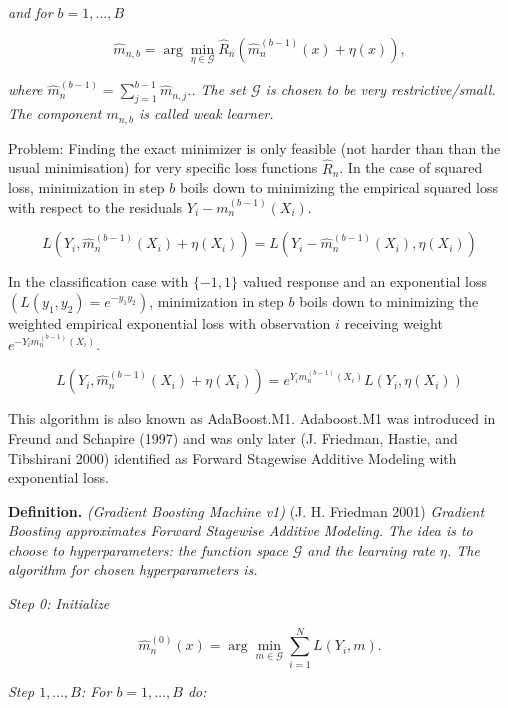\documentclass[
]{book}
\begin{document}
\emph{and for \(b=1,\dots,B\)}

\[
\hat m_{n,b} =  \arg \min_{\eta\in \mathcal G} \hat R_n\left( \hat m_n^{(b-1)}(x)+\eta(x)\right),
\]

\emph{where \(\hat m_n^{(b-1)}=\sum_{j=1}^{b-1}\hat m_{n,j}.\). The set \(\mathcal G\) is chosen to be very restrictive/small. The component \(m_{n,b}\) is called weak learner.}

Problem: Finding the exact minimizer is only feasible (not harder than than the usual minimisation) for very specific loss functions \(\hat R_n\). In the case of squared loss, minimization in step \(b\) boils down to minimizing the empirical squared loss with respect to the residuals \(Y_i- m_n^{(b-1)}(X_i)\).

\[
L\left(Y_i, \hat m_n^{(b-1)}(X_i)+\eta(X_i)\right)=L\left(Y_i-\hat m_n^{(b-1)}(X_i),\eta(X_i)\right)
\]

In the classification case with \(\{-1,1\}\) valued response and an exponential loss \((L(y_1,y_2)=e^{-y_1y_2})\), minimization in step \(b\) boils down to minimizing the weighted empirical exponential loss with observation \(i\) receiving weight \(e^{-Y_im_n^{(b-1)}(X_i)}\).

\[
L\left(Y_i,  \hat m_n^{(b-1)}(X_i)+\eta(X_i)\right)=e^{Y_im_n^{(b-1)}(X_i)}L\left(Y_i,\eta(X_i)\right)
\]

This algorithm is also known as AdaBoost.M1. Adaboost.M1 was introduced in Freund and Schapire (1997) and was only later (J. Friedman, Hastie, and Tibshirani 2000) identified as Forward Stagewise Additive Modeling with exponential loss.

\textbf{Definition.} \emph{(Gradient Boosting Machine v1)} (J. H. Friedman 2001) \emph{Gradient Boosting approximates Forward Stagewise Additive Modeling. The idea is to choose to hyperparameters: the function space \(\mathcal G\) and the learning rate \(\eta\). The algorithm for chosen hyperparameters is.}

\emph{Step 0: Initialize}

\[
\hat m_{n}^{(0)}(x)=\arg \min_{m \in \mathcal G} \sum_{i=1}^N L\left(Y_i, m\right).
\]

\emph{Step \(1,..., B\): For \(b=1,\dots,B\) do:}
\end{document}
